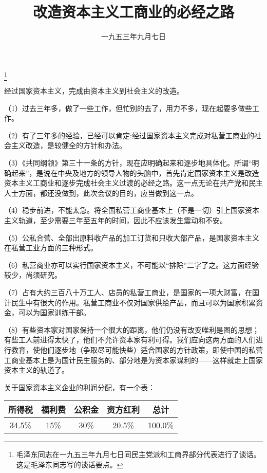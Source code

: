 
\title{改造资本主义工商业的必经之路}
\date{一九五三年九月七日}
\thanks{毛泽东同志在一九五三年九月七日同民主党派和工商界部分代表进行了谈话。这是毛泽东同志写的谈话要点。}
\maketitle


经过国家资本主义，完成由资本主义到社会主义的改造。

（1）过去三年多，做了一些工作，但忙别的去了，用力不多，现在起要多做些工作。

（2）有了三年多的经验，已经可以肯定:经过国家资本主义完成对私营工商业的社会主义改造，是较健全的方针和办法。

（3）《共同纲领》第三十一条的方针，现在应明确起来和逐步地具体化。所谓“明确起来”，是说在中央及地方的领导人物的头脑中，首先肯定国家资本主义是改造资本主义工商业和逐步完成社会主义过渡的必经之路。这一点无论在共产党和民主人士方面，都还没做到，此次会议的目的，应当做到这一点。

（4）稳步前进，不能太急。将全国私营工商业基本上（不是一切）引上国家资本主义轨道，至少需要三年至五年的时间，因此不应该发生震动和不安。

（5）公私合营、全部出原料收产品的加工订货和只收大部产品，是国家资本主义在私营工业方面的三种形式。

（6）私营商业亦可以实行国家资本主义，不可能以“排除”二字了之。这方面经验较少，尚须研究。

（7）占有大约三百八十万工人、店员的私营工商业，是国家的一项大财富，在国计民生中有很大的作用。私营工商业不仅对国家供给产品，而且可以为国家积累资金，可以为国家训练干部。

（8）有些资本家对国家保持一个很大的距离，他们仍没有改变唯利是图的思想；有些工人前进得太快了，他们不允许资本家有利可得。我们应向这两方面的人们进行教育，使他们逐步地（争取尽可能快些）适合国家的方针政策，即使中国的私营工商业基本上是为国计民生服务的、部分地是为资本家谋利的——这样就走上国家资本主义的轨道了。

关于国家资本主义企业的利润分配，有一个表：

\begin{center}
\begin{tabular}{ccccc}
\toprule
所得税 & 福利费 & 公积金 & 资方红利 & 总计 \\
\midrule
34.5\% & 15\%  & 30\%   & 20.5\%   & 100.0\%  \\
\bottomrule
\end{tabular}
\end{center}

